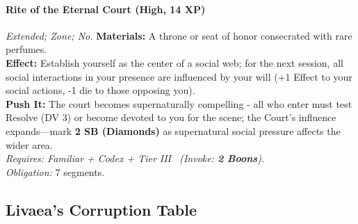 \paragraph{Rite of the Eternal Court (High, 14 XP)} \emph{Extended; Zone; No.}
\textbf{Materials:} A throne or seat of honor consecrated with rare perfumes. \\
\textbf{Effect:} Establish yourself as the center of a social web; for the next session, all social interactions in your presence are influenced by your will (+1 Effect to your social actions, -1 die to those opposing you). \\
\textbf{Push It:} The court becomes supernaturally compelling - all who enter must test Resolve (DV 3) or become devoted to you for the scene; the Court's influence expands—mark \textbf{2 SB (Diamonds)} as supernatural social pressure affects the wider area. \\
\emph{Requires: Familiar + Codex + Tier III \ (\textit{Invoke:} \textbf{2 Boons}).} \\
\emph{Obligation:} 7 segments.

\subsection*{Livaea's Corruption Table}
\label{sec:livaea-corruption}

